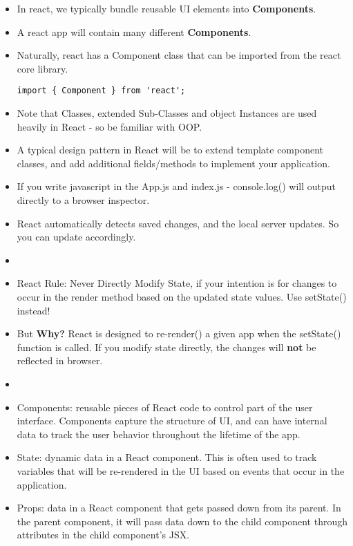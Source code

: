\documentclass[8pt,a4paper]{extarticle}
\begin{document}
\begin{itemize}
\item In react, we typically bundle reusable UI elements into \textbf{Components}. 
\item A react app will contain many different \textbf{Components}.
\item Naturally, react has a Component class that can be imported from the react core library.

\begin{verbatim}
import { Component } from 'react';
\end{verbatim}

\item Note that Classes, extended Sub-Classes and object Instances are used heavily in React - so be familiar with OOP.
\item A typical design pattern in React will be to extend template component classes, and add additional fields/methods to implement your application.
\item If you write javascript in the App.js and index.js - console.log() will output directly to a browser inspector.
\item React automatically detects saved changes, and the local server updates. So you can update accordingly.
\item
\item React Rule: Never Directly Modify State, if your intention is for changes to occur in the render method based on the updated state values. Use setState() instead!
\item But \textbf{Why?} React is designed to re-render() a given app when the setState() function is called. If you modify state directly, the changes will \textbf{not} be reflected in browser.
\item

\item Components: reusable pieces of React code to control part of the user interface. Components capture the structure of UI, and can have internal data to track the user behavior throughout the lifetime of the app.

\item State: dynamic data in a React component. This is often used to track variables that will be re-rendered in the UI based on events that occur in the application.

\item Props: data in a React component that gets passed down from its parent. In the parent component, it will pass data down to the child component through attributes in the child component’s JSX.
\end{itemize}
\end{document}
